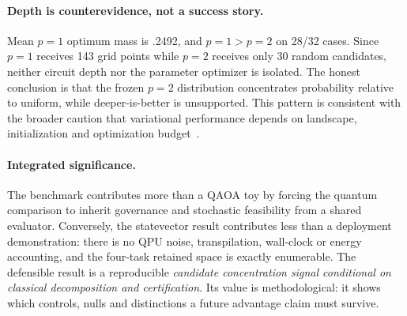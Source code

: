 \paragraph{Depth is counterevidence, not a success story.}
Mean $p=1$ optimum mass is .2492, and $p=1>p=2$ on 28/32 cases. Since $p=1$ receives 143 grid points while $p=2$ receives only 30 random candidates, neither circuit depth nor the parameter optimizer is isolated. The honest conclusion is that the frozen $p=2$ distribution concentrates probability relative to uniform, while deeper-is-better is unsupported. This pattern is consistent with the broader caution that variational performance depends on landscape, initialization and optimization budget~\citep{zhou2020qaoa,cerezo2021variational,blekos2024review}.



\paragraph{Integrated significance.}
The benchmark contributes more than a QAOA toy by forcing the quantum comparison to inherit governance and stochastic feasibility from a shared evaluator. Conversely, the statevector result contributes less than a deployment demonstration: there is no QPU noise, transpilation, wall-clock or energy accounting, and the four-task retained space is exactly enumerable. The defensible result is a reproducible \emph{candidate concentration signal conditional on classical decomposition and certification}. Its value is methodological: it shows which controls, nulls and distinctions a future advantage claim must survive.
